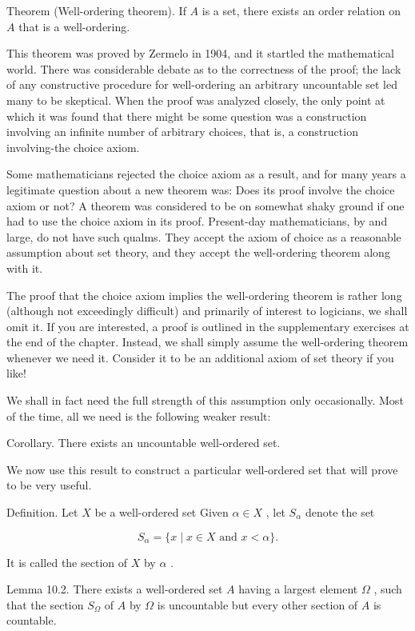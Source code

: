 \documentclass[10pt]{article}
\begin{document}
Theorem (Well-ordering theorem). If \(A\) is a set, there exists an order relation on \(A\) that is a well-ordering.

This theorem was proved by Zermelo in 1904, and it startled the mathematical world. There was considerable debate as to the correctness of the proof; the lack of any constructive procedure for well-ordering an arbitrary uncountable set led many to be skeptical. When the proof was analyzed closely, the only point at which it was found that there might be some question was a construction involving an infinite number of arbitrary choices, that is, a construction involving-the choice axiom.

Some mathematicians rejected the choice axiom as a result, and for many years a legitimate question about a new theorem was: Does its proof involve the choice axiom or not? A theorem was considered to be on somewhat shaky ground if one had to use the choice axiom in its proof. Present-day mathematicians, by and large, do not have such qualms. They accept the axiom of choice as a reasonable assumption about set theory, and they accept the well-ordering theorem along with it.

The proof that the choice axiom implies the well-ordering theorem is rather long (although not exceedingly difficult) and primarily of interest to logicians, we shall omit it. If you are interested, a proof is outlined in the supplementary exercises at the end of the chapter. Instead, we shall simply assume the well-ordering theorem whenever we need it. Consider it to be an additional axiom of set theory if you like!

We shall in fact need the full strength of this assumption only occasionally. Most of the time, all we need is the following weaker result:

Corollary. There exists an uncountable well-ordered set.

We now use this result to construct a particular well-ordered set that will prove to be very useful.

Definition. Let \(X\) be a well-ordered set Given \(\alpha  \in  X\) , let \({S}_{\alpha }\) denote the set

\[
{S}_{\alpha } = \{ x \mid  x \in  X\text{ and }x < \alpha \} .
\]

It is called the section of \(X\) by \(\alpha\) .

Lemma 10.2. There exists a well-ordered set \(A\) having a largest element \(\Omega\) , such that the section \({S}_{\Omega }\) of \(A\) by \(\Omega\) is uncountable but every other section of \(A\) is countable.
\end{document}
